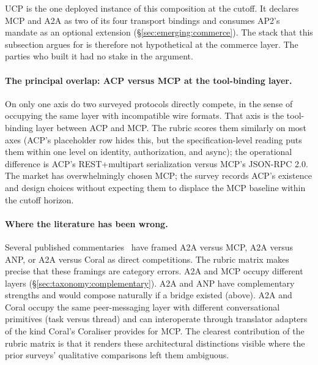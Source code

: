 UCP is the one deployed instance of this composition at the
cutoff. It declares MCP and A2A as two of its four transport
bindings and consumes AP2's mandate as an optional extension
(\S\ref{sec:emerging:commerce}). The stack that this
subsection argues for is therefore not hypothetical at the
commerce layer. The parties who built it had no stake in the
argument.

\paragraph{The principal overlap: ACP versus MCP at
the tool-binding layer.}
On only one axis do two surveyed protocols directly
compete, in the sense of occupying the same layer with
incompatible wire formats. That axis is the tool-binding layer
between ACP and MCP. The rubric scores them similarly on
most axes (ACP's placeholder row hides this, but the
specification-level reading puts them within one level on
identity, authorization, and async); the operational
difference is ACP's REST+multipart serialization versus
MCP's JSON-RPC 2.0. The market has overwhelmingly chosen
MCP; the survey records ACP's existence and design choices
without expecting them to displace the MCP baseline within
the cutoff horizon.

\paragraph{Where the literature has been wrong.}
Several published commentaries~\cite{ehtesham2025interop,
yang2025survey, protocolbench} have framed A2A versus
MCP, A2A versus ANP, or A2A versus Coral as direct
competitions. The rubric matrix makes precise that these
framings are category errors. A2A and MCP occupy
different layers (\S\ref{sec:taxonomy:complementary}).
A2A and ANP have complementary strengths and would
compose naturally if a bridge existed (above). A2A and
Coral occupy the same peer-messaging layer with
different conversational primitives (task versus
thread) and can interoperate through translator
adapters of the kind Coral's Coraliser provides for MCP.
The clearest contribution of the rubric matrix is that
it renders these architectural distinctions visible
where the prior surveys' qualitative comparisons left
them ambiguous.
